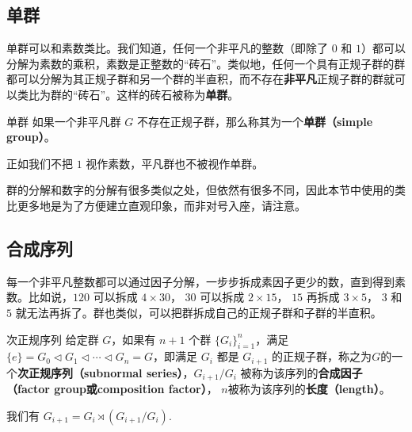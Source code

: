 

\subsection{单群}

单群可以和素数类比。我们知道，任何一个非平凡的整数（即除了 $0$ 和 $1$）都可以分解为素数的乘积，素数是正整数的“砖石”。类似地，任何一个具有正规子群的群都可以分解为其正规子群和另一个群的半直积，而不存在\textbf{非平凡}正规子群的群就可以类比为群的“砖石”。这样的砖石被称为\textbf{单群}。

\begin{definition}{单群}
如果一个非平凡群 $G$ 不存在正规子群，那么称其为一个\textbf{单群（simple group）}。
\end{definition}

正如我们不把 $1$ 视作素数，平凡群也不被视作单群。 

群的分解和数字的分解有很多类似之处，但依然有很多不同，因此本节中使用的类比更多地是为了方便建立直观印象，而非对号入座，请注意。

\subsection{合成序列}

每一个非平凡整数都可以通过因子分解，一步步拆成素因子更少的数，直到得到素数。比如说，$120$ 可以拆成 $4 \times 30$， $30$ 可以拆成 $2 \times 15$， $15$ 再拆成 $3 \times 5$， $3$ 和 $5$ 就无法再拆了。群也类似，可以把群拆成自己的正规子群和子群的半直积。

\begin{definition}{次正规序列}
给定群 $G$，如果有 $n+1$ 个群 $\{G_i\}_{i = 1}^n$，满足 $\{e\} = G_0 \triangleleft G_1 \triangleleft \cdots \triangleleft G_n = G$，即满足 $G_{i}$ 都是 $G_{i+1}$ 的正规子群，称之为$G$的一个\textbf{次正规序列（subnormal series）}，$G_{i+1} / G_{i}$ 被称为该序列的\textbf{合成因子（factor group或composition factor）}， $n$被称为该序列的\textbf{长度（length）}。
\end{definition}

我们有 $G_{i + 1} = G_{i} \rtimes (G_{i+1} / G_{i})$.



